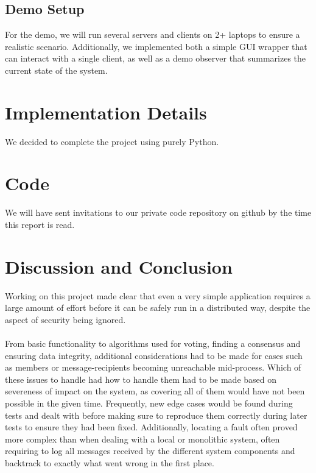 \documentclass[runningheads]{llncs}
\begin{document}
\subsection{Demo Setup}
For the demo, we will run several servers and clients on 2+ laptops to ensure a realistic scenario.
Additionally, we implemented both a simple GUI wrapper that can interact with a single client, as well as a demo observer that summarizes the current state of the system.
\section{Implementation Details}
We decided to complete the project using purely Python.











\newpage
\section{Code}
We will have sent invitations to our private code repository on github by the time this report is read.

\section{Discussion and Conclusion}
Working on this project made clear that even a very simple application requires a large amount of effort before it can be safely run in a distributed way, despite the aspect of security being ignored.
\\\\
From basic functionality to algorithms used for voting, finding a consensus and ensuring data integrity, additional considerations had to be made for cases such as members or message-recipients becoming unreachable mid-process. Which of these issues to handle had how to handle them had to be made based on severeness of impact on the system, as covering all of them would have not been possible in the given time.
Frequently, new edge cases would be found during tests and dealt with  before making sure to reproduce them correctly during later tests to ensure they had been fixed.
Additionally, locating a fault often proved more complex than when dealing with a local or monolithic system, often requiring to log all messages received by the different system components and backtrack to exactly what went wrong in the first place.
\end{document}
